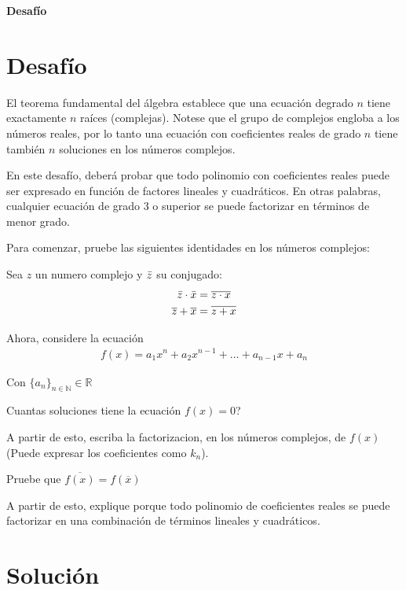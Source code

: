 \documentclass[spanish,12pt]{article}
\begin{document}
	\begin{titlepage}
	\begin{center}
	\hspace{0pt}
	\vfill
	{\Large\textbf{{Desafío}}}
	
	\thispagestyle{empty}
	\vfill
	\end{center}
	\end{titlepage}
\newpage
\section{Desafío}

El teorema fundamental del álgebra establece que una ecuación degrado $n$ tiene exactamente $n$ raíces (complejas). Notese que el grupo de complejos engloba a los números reales, por lo tanto una ecuación con coeficientes reales de grado $n$ tiene también $n$ soluciones en los números complejos.

En este desafío, deberá probar que todo polinomio con coeficientes reales puede ser expresado en función de factores lineales y cuadráticos. En otras palabras, cualquier ecuación de grado 3 o superior se puede factorizar en términos de menor grado.

Para comenzar,  pruebe las siguientes identidades en los números complejos:

Sea $z$ un numero complejo y $\Bar{z}$ su conjugado:
\begin{align*}
    \Bar{z} \cdot \Bar{x} &= \overline{z\cdot x}\\
    \overline{z}+\overline{x}&=\overline{z+x}
\end{align*}

Ahora, considere la ecuación
\begin{align*}
    f(x)=a_1x^n+a_2x^{n-1}+\dots+a_{n-1}x+a_n
\end{align*}

Con $\{a_n\}_{n \in \mathbb{N}}\in \mathbb{R}$

Cuantas soluciones tiene la ecuación $f(x)=0$?

A partir de esto, escriba la factorizacion, en los números complejos, de $f(x)$ (Puede expresar los coeficientes como $k_n$).

Pruebe que $\overline{f(x)}=f(\overline{x})$

A partir de esto, explique porque todo polinomio de coeficientes reales se puede factorizar en una combinación de términos lineales y cuadráticos.
\newpage
\section{Solución}
\end{document}
